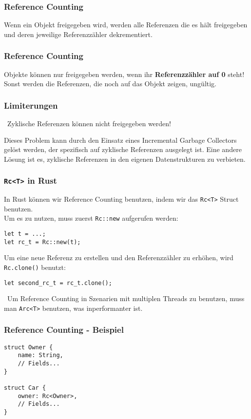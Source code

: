 \documentclass{beamer}
\newcommand{\attention}{{\scalebox{.75}{\bf}}\ }
\begin{document}
\begin{frame}
	\frametitle{Reference Counting}
	Wenn ein Objekt freigegeben wird, werden alle Referenzen die es hält freigegeben und deren jeweilige Referenzzähler dekrementiert.
	\begin{figure}
		\def\svgwidth{120pt}
		\LARGE
		
	\end{figure}
\end{frame}
\begin{frame}
	\frametitle{Reference Counting}
	Objekte können nur freigegeben werden, wenn ihr \textbf{Referenzzähler auf 0} steht! Sonst werden die Referenzen, die noch auf das Objekt zeigen, ungültig.
	\begin{figure}
		\def\svgwidth{120pt}
		\LARGE
		
	\end{figure}
\end{frame}
\begin{frame}
	\frametitle{Limiterungen}
	\attention Zyklische Referenzen können nicht freigegeben werden!
	\begin{figure}
		\def\svgwidth{100pt}
		
	\end{figure}
	Dieses Problem kann durch den Einsatz eines Incremental Garbage Collectors gelöst werden, der spezifisch auf zyklische Referenzen ausgelegt ist.
	Eine andere Lösung ist es, zyklische Referenzen in den eigenen Datenstrukturen zu verbieten.
\end{frame}
\begin{frame}[fragile]
	\frametitle{\texttt{Rc<T>} in Rust}
	In Rust können wir Reference Counting benutzen, indem wir das \texttt{Rc<T>} Struct benutzen.
	\\
	Um es zu nutzen, muss zuerst \texttt{Rc::new} aufgerufen werden:
	\begin{verbatim}
let t = ...;
let rc_t = Rc::new(t);
	\end{verbatim}
	Um eine neue Referenz zu erstellen und den Referenzzähler zu erhöhen, wird \texttt{Rc.clone()} benutzt:
	\begin{verbatim}
let second_rc_t = rc_t.clone();
	\end{verbatim}
	\attention Um Reference Counting in Szenarien mit multiplen Threads zu benutzen, muss man \texttt{Arc<T>} benutzen, was inperformanter ist.
\end{frame}
\begin{frame}[fragile]
	\frametitle{Reference Counting - Beispiel}
	\begin{verbatim}
struct Owner {
	name: String,
	// Fields...
}

struct Car {
	owner: Rc<Owner>,
	// Fields...
}
	\end{verbatim}
\end{frame}
\end{document}
